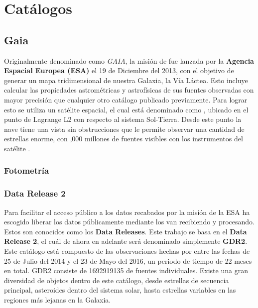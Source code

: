 \chapter{Catálogos}

\section{Gaia} \label{muestra:sec:gaia}

Originalmente denominado como \textit{GAIA}, la misión de \gaia fue lanzada por
la \textbf{Agencia Espacial Europea (ESA)} el 19 de Diciembre del 2013, con el
objetivo de generar un mapa tridimensional de nuestra Galaxia, la Vía Láctea.
Esto incluye calcular las propiedades astrométricas y astrofísicas de sus
fuentes observadas con mayor precisión que cualquier otro catálogo publicado
previamente. Para lograr esto se utiliza un satélite espacial, el cual está
denominado como \gaiaNoSpace, ubicado en el punto de Lagrange L2 con respecto al
sistema Sol-Tierra. Desde este punto la nave tiene una vista sin obstrucciones
que le permite observar una cantidad de estrellas enorme, con ,000 millones de fuentes visibles con los instrumentos del satélite
\gaiaNoSpace. \autocite{gaiaMission}

\subsection{Fotometría}

\subsection{Data Release 2} \label{muestra:sec:gaia:dr2}

Para facilitar el acceso público a los datos recabados por la misión de \gaia la
ESA ha escogido liberar los datos públicamente mediante los van recibiendo y
procesando. Estos son conocidos como los \textbf{Data Releases}. Este trabajo se
basa en el \textbf{Data Release 2}, el cuál de ahora en adelante será denominado
simplemente \textbf{GDR2}. Este catálogo está compuesto de las observaciones
hechas por \gaia entre las fechas de 25 de Julio del 2014 y el 23 de Mayo del
2016, un periodo de tiempo de 22 meses en total. \autocite{gaiaDr2} GDR2 consiste
de \num{1692919135} de fuentes individuales. Existe una gran diversidad de objetos
dentro de este catálogo, desde estrellas de secuencia principal, asteroides
dentro del sistema solar, hasta estrellas variables en las regiones más lejanas
en la Galaxia.

